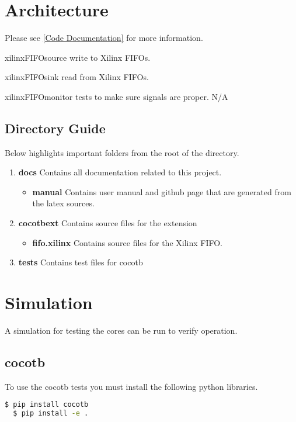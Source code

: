 \section{Architecture}

Please see \ref{Code Documentation} for more information.

\par
xilinxFIFOsource write to Xilinx FIFOs.
\par
xilinxFIFOsink read from Xilinx FIFOs.
\par
xilinxFIFOmonitor tests to make sure signals are proper. N/A

\subsection{Directory Guide}

\par
Below highlights important folders from the root of the directory.

\begin{enumerate}
  \item \textbf{docs} Contains all documentation related to this project.
    \begin{itemize}
      \item \textbf{manual} Contains user manual and github page that are generated from the latex sources.
    \end{itemize}
  \item \textbf{cocotbext} Contains source files for the extension
    \begin{itemize}
      \item \textbf{fifo.xilinx} Contains source files for the Xilinx FIFO.
    \end{itemize}
  \item \textbf{tests} Contains test files for cocotb
\end{enumerate}

\newpage

\section{Simulation}
\par
A simulation for testing the cores can be run to verify operation.

\subsection{cocotb}
\par
To use the cocotb tests you must install the following python libraries.
\begin{lstlisting}[language=bash]
  $ pip install cocotb
  $ pip install -e .
\end{lstlisting}

